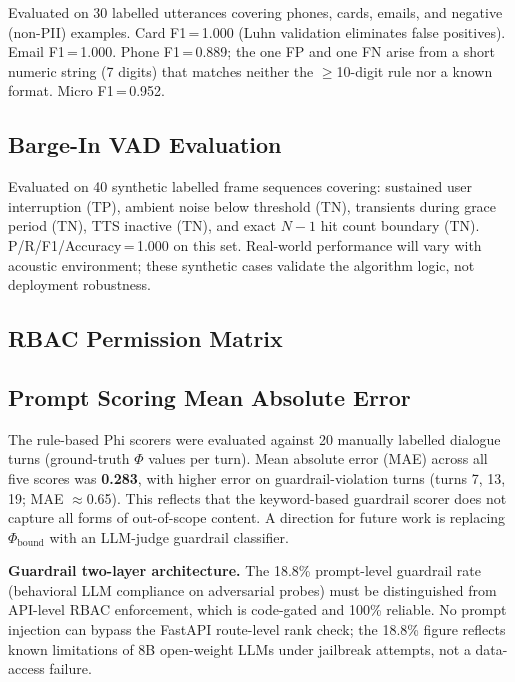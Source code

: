 \documentclass[journal]{IEEEtran}
\begin{document}


Evaluated on 30 labelled utterances covering phones, cards, emails, and
negative (non-PII) examples. Card F1\,=\,1.000 (Luhn validation eliminates
false positives). Email F1\,=\,1.000. Phone F1\,=\,0.889; the one FP and
one FN arise from a short numeric string (7 digits) that matches neither
the $\geq$10-digit rule nor a known format. Micro F1\,=\,0.952.

\subsection{Barge-In VAD Evaluation}



Evaluated on 40 synthetic labelled frame sequences covering: sustained
user interruption (TP), ambient noise below threshold (TN), transients
during grace period (TN), TTS inactive (TN), and exact $N{-}1$ hit count
boundary (TN). P/R/F1/Accuracy\,=\,1.000 on this set. Real-world
performance will vary with acoustic environment; these synthetic cases
validate the algorithm logic, not deployment robustness.

\subsection{RBAC Permission Matrix}



\subsection{Prompt Scoring Mean Absolute Error}

The rule-based Phi scorers were evaluated against 20 manually labelled
dialogue turns (ground-truth $\Phi$ values per turn). Mean absolute
error (MAE) across all five scores was \textbf{0.283}, with higher
error on guardrail-violation turns (turns 7, 13, 19; MAE $\approx$0.65).
This reflects that the keyword-based guardrail scorer does not capture
all forms of out-of-scope content. A direction for future work is
replacing $\Phi_\text{bound}$ with an LLM-judge guardrail classifier.

\textbf{Guardrail two-layer architecture.}
The 18.8\% prompt-level guardrail rate (behavioral LLM compliance on
adversarial probes) must be distinguished from API-level RBAC enforcement,
which is code-gated and 100\% reliable. No prompt injection can bypass the
FastAPI route-level rank check; the 18.8\% figure reflects known limitations
of 8B open-weight LLMs under jailbreak attempts, not a data-access failure.
\end{document}
